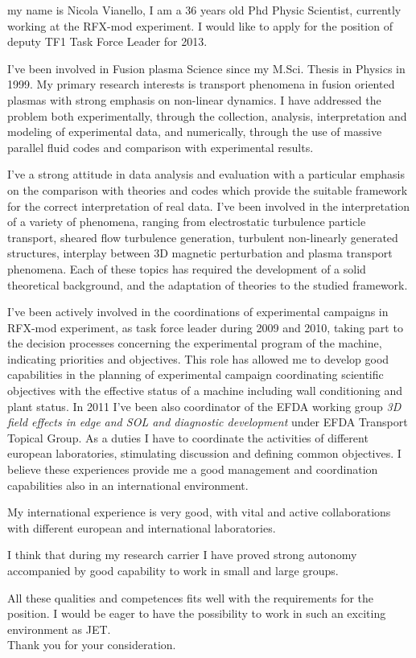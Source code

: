 \documentclass[12pt,stdletter,a4paper,dateno,sigleft]{newlfm}
\begin{document}
\begin{newlfm}
my name is Nicola Vianello, I am a 36 years old Phd Physic Scientist,
currently working at the RFX-mod experiment. I would like to apply for
the position of deputy TF1 Task Force Leader for 2013.

I've been involved in Fusion plasma Science since my M.Sci. Thesis in
Physics in 1999. My primary research interests is transport phenomena in fusion
oriented plasmas with strong emphasis on non-linear dynamics. I have
addressed the problem both experimentally, through the collection, 
analysis, interpretation and modeling of experimental data, and
numerically, through the use of massive parallel fluid codes and
comparison with experimental results. 

I've a strong attitude in
data analysis and evaluation with a particular emphasis on the
comparison with theories and codes which provide the suitable framework for the
correct interpretation of real data. I've been involved in
the interpretation of a variety of phenomena, ranging from electrostatic
turbulence particle transport, sheared flow turbulence generation,
turbulent non-linearly generated structures, interplay between 3D
magnetic perturbation and plasma transport phenomena. Each of these
topics has required the development of a solid theoretical
background, and the adaptation of theories to the studied framework.

I've been actively involved in the coordinations of experimental
campaigns in RFX-mod experiment, as task force leader during 2009 and
2010, taking part to the decision processes concerning the
experimental program of the machine, indicating priorities and
objectives. This role has allowed me to develop good capabilities in
the planning of experimental campaign coordinating scientific
objectives with the effective status of a machine including wall
conditioning and plant status.
In 2011 I've been also coordinator of the 
EFDA working group \emph{3D field effects in
  edge and SOL and diagnostic development} under EFDA Transport
Topical Group. As a duties I have to coordinate the
activities of different  european laboratories, stimulating
discussion and defining common objectives. I believe these experiences
provide me a good management and coordination capabilities also in an
international environment. 

My international experience is very good, with vital and active
collaborations with different european and international laboratories. 

I think that during my research carrier I have proved strong autonomy
accompanied by good capability to work in small and large groups. 

All these qualities and competences fits well with the
requirements for the position. I would be eager to have the possibility to work in such an exciting environment as JET.\\
Thank you for your consideration. 

\end{newlfm}
\end{document}
